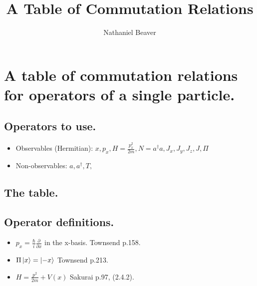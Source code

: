\documentclass[12pt,letterpaper]{article}
\author{Nathaniel Beaver}
\title{A Table of Commutation Relations}
\begin{document}
\maketitle

\section{A table of commutation relations for operators of a single particle.}

\subsection{Operators to use.}

\begin{itemize}
\item Observables (Hermitian): $x, p_x, H=\frac{p_x^2}{2m}, N=a^\dagger a, J_x, J_y, J_z, J, \hyperref[def_Pi]{\Pi}$
\item Non-observables: $a, a^\dagger, T, $
\end{itemize}

\subsection{The table.}

\renewcommand{\dtldisplayafterhead}{\hline} %
\renewcommand{\dtlstringalign}{c} %



\newpage

\subsection{Operator definitions.}
\begin{itemize}
\item \label{def_p_x} $p_x = \frac{\hbar}{i}\frac{\partial}{\partial x}$ in the x-basis. Townsend p.158.
\item \label{def_Pi} $\Pi\ket{x}=\ket{-x}$ Townsend p.213.
\item \label{def_H} $H = \frac{p^2}{2m} + V(x)$ Sakurai p.97, (2.4.2). 
\end{itemize}
\end{document}
